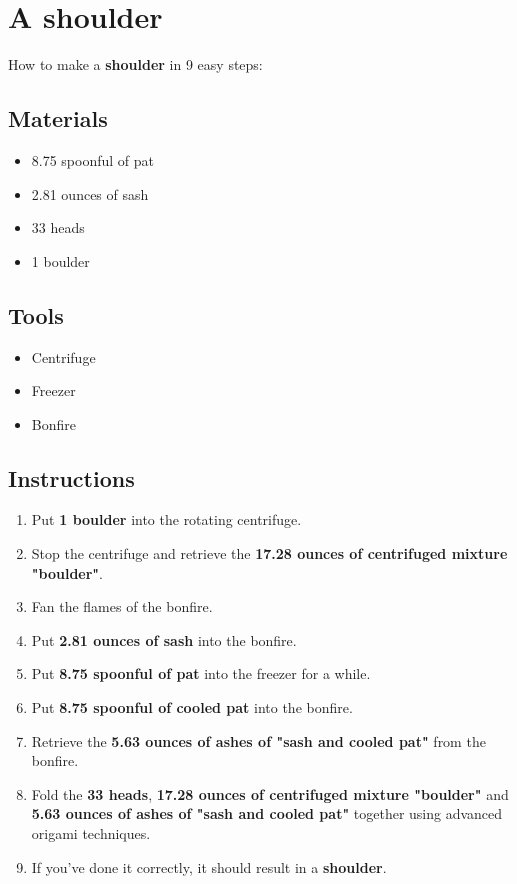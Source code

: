 \documentclass{article}
\begin{document}
\section{A shoulder}How to make a \textbf{shoulder} in 9 easy steps:

\subsection{Materials}\begin{itemize}
\item 
8.75 spoonful of pat
\item 
2.81 ounces of sash
\item 
33 heads
\item 
1 boulder
\end{itemize}
\subsection{Tools}\begin{itemize}
\item 
Centrifuge
\item 
Freezer
\item 
Bonfire
\end{itemize}
\subsection{Instructions}\begin{enumerate}
\item 
Put \textbf{1 boulder} into the rotating centrifuge.
\item 
Stop the centrifuge and retrieve the \textbf{17.28 ounces of centrifuged mixture "boulder"}.
\item 
Fan the flames of the bonfire.
\item 
Put \textbf{2.81 ounces of sash} into the bonfire.
\item 
Put \textbf{8.75 spoonful of pat} into the freezer for a while.
\item 
Put \textbf{8.75 spoonful of cooled pat} into the bonfire.
\item 
Retrieve the \textbf{5.63 ounces of ashes of "sash and cooled pat"} from the bonfire.
\item 
Fold the \textbf{33 heads}, \textbf{17.28 ounces of centrifuged mixture "boulder"} and \textbf{5.63 ounces of ashes of "sash and cooled pat"} together using advanced origami techniques.
\item 
If you've done it correctly, it should result in a \textbf{shoulder}.
\end{enumerate}
\newpage
\end{document}
